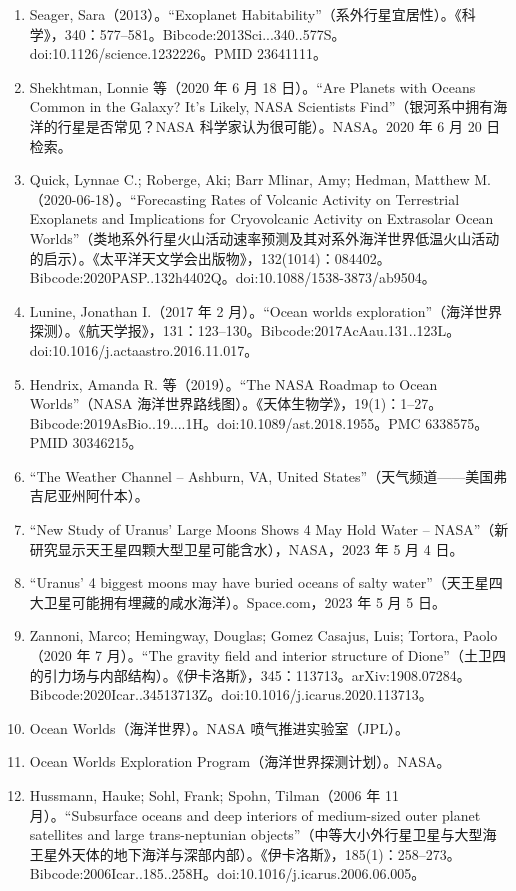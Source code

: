 \begin{enumerate}
\item Seager, Sara（2013）。“Exoplanet Habitability”（系外行星宜居性）。《科学》，340：577–581。Bibcode:2013Sci...340..577S。doi:10.1126/science.1232226。PMID 23641111。
\item Shekhtman, Lonnie 等（2020 年 6 月 18 日）。“Are Planets with Oceans Common in the Galaxy? It’s Likely, NASA Scientists Find”（银河系中拥有海洋的行星是否常见？NASA 科学家认为很可能）。NASA。2020 年 6 月 20 日检索。
\item Quick, Lynnae C.; Roberge, Aki; Barr Mlinar, Amy; Hedman, Matthew M.（2020-06-18）。“Forecasting Rates of Volcanic Activity on Terrestrial Exoplanets and Implications for Cryovolcanic Activity on Extrasolar Ocean Worlds”（类地系外行星火山活动速率预测及其对系外海洋世界低温火山活动的启示）。《太平洋天文学会出版物》，132(1014)：084402。Bibcode:2020PASP..132h4402Q。doi:10.1088/1538-3873/ab9504。
\item Lunine, Jonathan I.（2017 年 2 月）。“Ocean worlds exploration”（海洋世界探测）。《航天学报》，131：123–130。Bibcode:2017AcAau.131..123L。doi:10.1016/j.actaastro.2016.11.017。
\item Hendrix, Amanda R. 等（2019）。“The NASA Roadmap to Ocean Worlds”（NASA 海洋世界路线图）。《天体生物学》，19(1)：1–27。Bibcode:2019AsBio..19....1H。doi:10.1089/ast.2018.1955。PMC 6338575。PMID 30346215。
\item “The Weather Channel – Ashburn, VA, United States”（天气频道——美国弗吉尼亚州阿什本）。
\item “New Study of Uranus’ Large Moons Shows 4 May Hold Water – NASA”（新研究显示天王星四颗大型卫星可能含水），NASA，2023 年 5 月 4 日。
\item “Uranus’ 4 biggest moons may have buried oceans of salty water”（天王星四大卫星可能拥有埋藏的咸水海洋）。Space.com，2023 年 5 月 5 日。
\item Zannoni, Marco; Hemingway, Douglas; Gomez Casajus, Luis; Tortora, Paolo（2020 年 7 月）。“The gravity field and interior structure of Dione”（土卫四的引力场与内部结构）。《伊卡洛斯》，345：113713。arXiv:1908.07284。Bibcode:2020Icar..34513713Z。doi:10.1016/j.icarus.2020.113713。
\item Ocean Worlds（海洋世界）。NASA 喷气推进实验室（JPL）。
\item Ocean Worlds Exploration Program（海洋世界探测计划）。NASA。
\item Hussmann, Hauke; Sohl, Frank; Spohn, Tilman（2006 年 11 月）。“Subsurface oceans and deep interiors of medium-sized outer planet satellites and large trans-neptunian objects”（中等大小外行星卫星与大型海王星外天体的地下海洋与深部内部）。《伊卡洛斯》，185(1)：258–273。Bibcode:2006Icar..185..258H。doi:10.1016/j.icarus.2006.06.005。

\end{enumerate}
